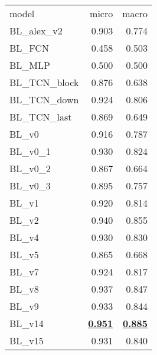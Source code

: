 \begin{adjustbox}{width=\textwidth}
\begin{tabular}{lrr}
{model} & {micro} & {macro} \\
BL\_alex\_v2 & 0.903 & 0.774 \\
BL\_FCN & 0.458 & 0.503 \\
BL\_MLP & 0.500 & 0.500 \\
BL\_TCN\_block & 0.876 & 0.638 \\
BL\_TCN\_down & 0.924 & 0.806 \\
BL\_TCN\_last & 0.869 & 0.649 \\
BL\_v0 & 0.916 & 0.787 \\
BL\_v0\_1 & 0.930 & 0.824 \\
BL\_v0\_2 & 0.867 & 0.664 \\
BL\_v0\_3 & 0.895 & 0.757 \\
BL\_v1 & 0.920 & 0.814 \\
BL\_v2 & 0.940 & 0.855 \\
BL\_v4 & 0.930 & 0.830 \\
BL\_v5 & 0.865 & 0.668 \\
BL\_v7 & 0.924 & 0.817 \\
BL\_v8 & 0.937 & 0.847 \\
BL\_v9 & 0.933 & 0.844 \\
BL\_v14 & \bfseries \underline{0.951} & \bfseries \underline{0.885} \\
BL\_v15 & 0.931 & 0.840 \\
\end{tabular}
\end{adjustbox}
